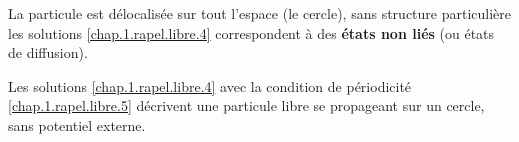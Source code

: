 {	\smallskip
	
	La particule est délocalisée sur tout l’espace (le cercle), sans structure particulière \ie les solutions \eqref{chap.1.rapel.libre.4} correspondent à des {\bf états non liés} (ou états de diffusion).

	Les solutions \eqref{chap.1.rapel.libre.4} avec la condition de périodicité \eqref{chap.1.rapel.libre.5} décrivent une particule libre se propageant sur un cercle, sans potentiel externe.

	}%



\medskip

